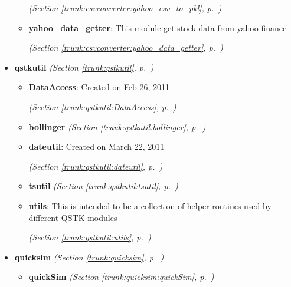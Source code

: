 \begin{itemize}
\begin{itemize}
  \textit{(Section \ref{trunk:csvconverter:yahoo_csv_to_pkl}, p.~\pageref{trunk:csvconverter:yahoo_csv_to_pkl})}

    \item \textbf{yahoo\_data\_getter}: This module get stock data from yahoo finance



  \textit{(Section \ref{trunk:csvconverter:yahoo_data_getter}, p.~\pageref{trunk:csvconverter:yahoo_data_getter})}

  \end{itemize}
\item \textbf{qstkutil}
  \textit{(Section \ref{trunk:qstkutil}, p.~\pageref{trunk:qstkutil})}

  \begin{itemize}
\setlength{\parskip}{0ex}
    \item \textbf{DataAccess}: Created on Feb 26, 2011



  \textit{(Section \ref{trunk:qstkutil:DataAccess}, p.~\pageref{trunk:qstkutil:DataAccess})}

    \item \textbf{bollinger}
  \textit{(Section \ref{trunk:qstkutil:bollinger}, p.~\pageref{trunk:qstkutil:bollinger})}

    \item \textbf{dateutil}: Created on March 22, 2011



  \textit{(Section \ref{trunk:qstkutil:dateutil}, p.~\pageref{trunk:qstkutil:dateutil})}

    \item \textbf{tsutil}
  \textit{(Section \ref{trunk:qstkutil:tsutil}, p.~\pageref{trunk:qstkutil:tsutil})}

    \item \textbf{utils}: This is intended to be a collection of helper routines used by different 
QSTK modules



  \textit{(Section \ref{trunk:qstkutil:utils}, p.~\pageref{trunk:qstkutil:utils})}

  \end{itemize}
\item \textbf{quicksim}
  \textit{(Section \ref{trunk:quicksim}, p.~\pageref{trunk:quicksim})}

  \begin{itemize}
\setlength{\parskip}{0ex}
    \item \textbf{quickSim}
  \textit{(Section \ref{trunk:quicksim:quickSim}, p.~\pageref{trunk:quicksim:quickSim})}

  \end{itemize}
\end{itemize}


